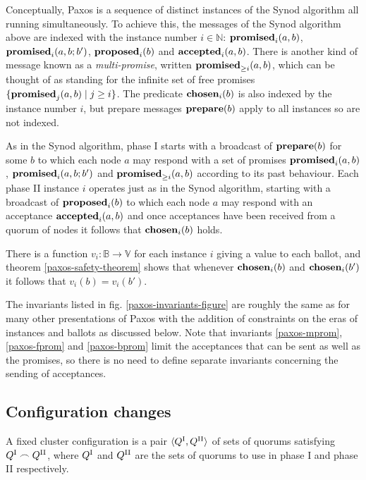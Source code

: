 \documentclass[journal]{IEEEtran}
\begin{document}
Conceptually, Paxos is a sequence of distinct instances of the Synod algorithm
all running simultaneously. To achieve this, the messages of the Synod
algorithm above are indexed with the instance number $i \in \mathbb N$:
$\mathbf{promised}_{i}(a,b)$, $\mathbf{promised}_{i}(a,b;b')$, $\mathbf{proposed}_{i}(b)$ and $\mathbf{accepted}_{i}(a,b)$.
There is another kind of message known as a \textit{multi-promise}, written
$\mathbf{promised}_{\ge i}(a,b)$, which can be thought of as standing for the infinite set of
free promises ${\{ \mathbf{promised}_{j}(a,b) \mid j \ge i \}}$. The predicate
$\mathbf{chosen}_{i}(b)$ is also indexed by the instance number $i$, but prepare
messages $\mathbf{prepare}(b)$ apply to all instances so are not indexed.

As in the Synod algorithm, phase I starts with a broadcast of $\mathbf{prepare}(b)$ for
some $b$ to which each node $a$ may respond with a set of promises
$\mathbf{promised}_{i}(a,b)$, $\mathbf{promised}_{i}(a,b;b')$ and $\mathbf{promised}_{\ge i}(a,b)$ according to its
past behaviour. Each phase II instance $i$ operates just as in the Synod
algorithm, starting with a broadcast of $\mathbf{proposed}_{i}(b)$ to which each node $a$
may respond with an acceptance $\mathbf{accepted}_{i}(a,b)$ and once acceptances have been
received from a quorum of nodes it follows that $\mathbf{chosen}_{i}(b)$ holds.

There is a function $v_i : \mathbb B \to \mathbb V$ for each instance $i$
giving a value to each ballot, and theorem \ref{paxos-safety-theorem} shows
that whenever $\mathbf{chosen}_{i}(b)$ and $\mathbf{chosen}_{i}(b')$ it follows that $v_i(b) =
v_i(b')$.

The invariants listed in fig. \ref{paxos-invariants-figure} are roughly the
same as for many other presentations of Paxos with the addition of constraints
on the eras of instances and ballots as discussed below. Note that invariants
\ref{paxos-mprom}, \ref{paxos-fprom} and \ref{paxos-bprom} limit the
acceptances that can be sent as well as the promises, so there is no need to
define separate invariants concerning the sending of acceptances.

\subsection{Configuration changes}\label{configuration-changes}

A fixed cluster configuration is a pair $\langle {Q}^\textrm{I}_{}, {Q}^\textrm{II}_{} \rangle$ of sets
of quorums satisfying ${Q}^\textrm{I}_{} \frown {Q}^\textrm{II}_{}$, where ${Q}^\textrm{I}_{}$ and ${Q}^\textrm{II}_{}$ are the
sets of quorums to use in phase I and phase II respectively.
\end{document}
